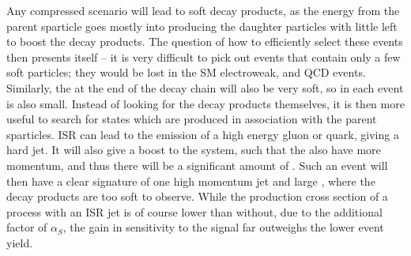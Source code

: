 Any compressed scenario will lead to soft decay products, 
as the energy from the parent sparticle goes mostly into producing the daughter particles with little left to boost the decay products.
The question of how to efficiently select these events then presents itself -- it is very difficult to pick out events that contain only a few soft particles; 
they would be lost in the \ac{SM} electroweak, \ttbar and \ac{QCD} events.
Similarly, the \chiOneZero at the end of the decay chain will also be very soft, so \MET in each event is also small. 
Instead of looking for the decay products themselves, it is then more useful to search for 
states which are produced in association with the parent sparticles.
\ac{ISR} can lead to the emission of a high energy gluon or quark, giving a hard jet. 
It will also give a boost to the system, such that the \chiOneZero also have more momentum, and thus there will be a significant amount of \MET.
Such an event will then have a clear signature of one high momentum jet and large \MET, where the decay products are too soft to observe. 
While the production cross section of a process with an \ac{ISR} jet is of course lower than without, due to the additional factor of $\alpha_{S}$, the gain in sensitivity to the signal far outweighs the lower event yield.



